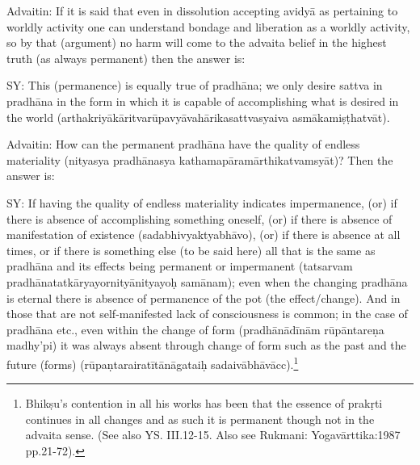
Advaitin: If it is said that even in dissolution accepting avidyā as pertaining to worldly activity one can understand bondage and liberation as a worldly activity,  so by that (argument) no harm will come to the advaita belief in the highest truth (as always permanent) then the answer is:

SY: This (permanence) is equally true of pradhāna; we only desire sattva in pradhāna in the form in which it is capable of accomplishing what is desired in the world (arthakriyākāritvarūpavyāvahārikasattvasyaiva asmākamiṣṭhatvāt).

Advaitin: How can the permanent pradhāna have the quality of endless materiality (nityasya pradhānasya kathamapāramārthikatvam\break syāt)? Then the answer is:

SY: If having the quality of endless materiality indicates impermanence, (or) if there is absence of accomplishing something oneself, (or) if there is absence of manifestation of existence (sadabhivyaktyabhāvo), (or) if there is absence at all times, or if there is something else (to be said here) all that is the same as pradhāna and its effects being permanent or impermanent (tatsarvam pradhānatatkāryayornityānityayoḥ samānam); even when the changing pradhāna is eternal there is absence of permanence of the pot (the effect/change). And in those that are not self-manifested lack of consciousness is common; in the case of pradhāna etc., even within the change of form (pradhānādīnām rūpān\-tareṇa madhy’pi) it was always absent through change of form such as the past and the future (forms) (rūpaṇtarairatītānāgataiḥ sadaivābhāvācc).\footnote{Bhikṣu’s contention in all his works has been that the essence of prakṛti continues in all changes and as such it is permanent though not in the advaita sense. (See also YS. III.12-15. Also see Rukmani: Yogavārttika:1987 pp.21-72).}

